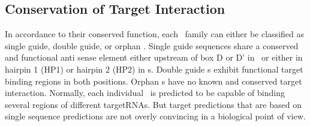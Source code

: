 %
%
%
%
%
%
%
%
%



\subsection{Conservation of Target Interaction}

In accordance to their conserved function, each
\sno\ family can either be classified as single guide, double guide,
or orphan \sno. Single guide sequences share a conserved and
functional anti sense element either upstream of box D or D' in \cd\
or either in hairpin 1 (HP1) or hairpin 2 (HP2) in \haca s. Double
guide \sno s exhibit functional target binding
regions in both positions. Orphan \sno s have no known and conserved
target interaction. Normally, each individual \sno\ is predicted to be capable of binding
several regions of different targetRNAs. But target predictions that
are based on single sequence predictions
are not overly convincing in a biological point of view. 

